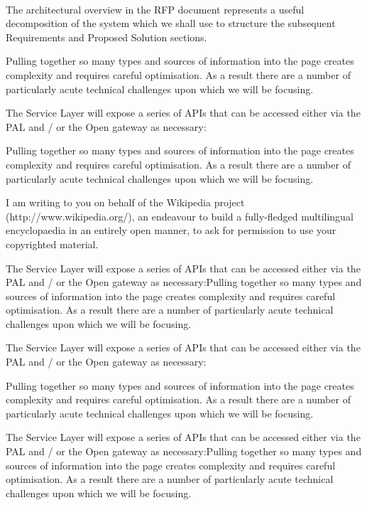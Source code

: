 \documentclass[10pt, paper=A4, parskip=full,asymTypB, subject=afteropening, subject=left,Farrukh
               enlargefirstpage ]{scrlttr2}
\begin{document}
\begin{letter}{%
\tystrrecipient \\
\tystrrecipientaddress
}
\opening{\tystropening}

The architectural overview in the RFP document represents a useful decomposition of the system which we shall use to structure the subsequent Requirements and Proposed Solution sections.

Pulling together so many types and sources of information into the page creates complexity and requires careful optimisation. As a result there are a number of particularly acute technical challenges upon which we will be focusing.

The Service Layer will expose a series of APIs that can be accessed either via the PAL and / or the Open gateway as necessary:

Pulling together so many types and sources of information into the page creates complexity and requires careful optimisation. As a result there are a number of particularly acute technical challenges upon which we will be focusing.

 
I am writing to you on behalf of the Wikipedia project (http://www.wikipedia.org/),
an endeavour to build a fully-fledged multilingual encyclopaedia in an entirely
open manner, to ask for permission to use your copyrighted material.

The Service Layer will expose a series of APIs that can be accessed either via the PAL and / or the Open gateway as necessary:Pulling together so many types and sources of information into the page creates complexity and requires careful optimisation. As a result there are a number of particularly acute technical challenges upon which we will be focusing.

The Service Layer will expose a series of APIs that can be accessed either via the PAL and / or the Open gateway as necessary:

Pulling together so many types and sources of information into the page creates complexity and requires careful optimisation. As a result there are a number of particularly acute technical challenges upon which we will be focusing.

The Service Layer will expose a series of APIs that can be accessed either via the PAL and / or the Open gateway as necessary:Pulling together so many types and sources of information into the page creates complexity and requires careful optimisation. As a result there are a number of particularly acute technical challenges upon which we will be focusing.


\end{letter}
\end{document}
